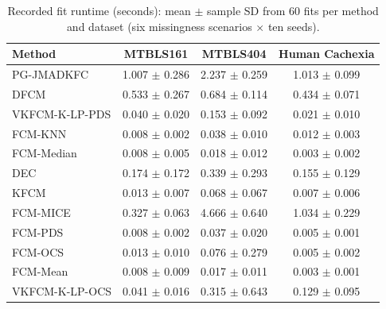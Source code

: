 \begin{table}[t]
\centering
\caption{Recorded fit runtime (seconds): mean $\pm$ sample SD from 60 fits per method and dataset (six missingness scenarios $\times$ ten seeds).}
\label{tab:supp_runtime}
\small
\setlength{\tabcolsep}{5pt}
\begin{tabular}{lccc}
\toprule
Method & MTBLS161 & MTBLS404 & Human Cachexia \\
\midrule
PG-JMADKFC & 1.007 $\pm$ 0.286 & 2.237 $\pm$ 0.259 & 1.013 $\pm$ 0.099 \\
DFCM & 0.533 $\pm$ 0.267 & 0.684 $\pm$ 0.114 & 0.434 $\pm$ 0.071 \\
VKFCM-K-LP-PDS & 0.040 $\pm$ 0.020 & 0.153 $\pm$ 0.092 & 0.021 $\pm$ 0.010 \\
FCM-KNN & 0.008 $\pm$ 0.002 & 0.038 $\pm$ 0.010 & 0.012 $\pm$ 0.003 \\
FCM-Median & 0.008 $\pm$ 0.005 & 0.018 $\pm$ 0.012 & 0.003 $\pm$ 0.002 \\
DEC & 0.174 $\pm$ 0.172 & 0.339 $\pm$ 0.293 & 0.155 $\pm$ 0.129 \\
KFCM & 0.013 $\pm$ 0.007 & 0.068 $\pm$ 0.067 & 0.007 $\pm$ 0.006 \\
FCM-MICE & 0.327 $\pm$ 0.063 & 4.666 $\pm$ 0.640 & 1.034 $\pm$ 0.229 \\
FCM-PDS & 0.008 $\pm$ 0.002 & 0.037 $\pm$ 0.020 & 0.005 $\pm$ 0.001 \\
FCM-OCS & 0.013 $\pm$ 0.010 & 0.076 $\pm$ 0.279 & 0.005 $\pm$ 0.002 \\
FCM-Mean & 0.008 $\pm$ 0.009 & 0.017 $\pm$ 0.011 & 0.003 $\pm$ 0.001 \\
VKFCM-K-LP-OCS & 0.041 $\pm$ 0.016 & 0.315 $\pm$ 0.643 & 0.129 $\pm$ 0.095 \\
\bottomrule
\end{tabular}
\end{table}



